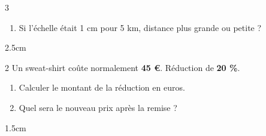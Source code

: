 \documentclass[a4paper]{book}
\begin{document}
{\begin{exerciceNote}{3}
\begin{enumerate}[leftmargin=*]
\newpage

            \item Si l'échelle était 1 cm pour 5 km, distance plus grande ou petite ?
        \end{enumerate}
    
        \begin{ZoneReponse}{2.5cm}
        \end{ZoneReponse}
    \end{exerciceNote}
    
    \begin{exerciceNote}{2}
        Un sweat-shirt coûte normalement \textbf{45 \euro}. Réduction de \textbf{20 \%}.
    
        \begin{enumerate}[leftmargin=*]
            \item Calculer le montant de la réduction en euros.
            \item Quel sera le nouveau prix après la remise ?
        \end{enumerate}
    
        \begin{ZoneReponse}{1.5cm}
        \end{ZoneReponse}
    \end{exerciceNote}
}
\end{document}
